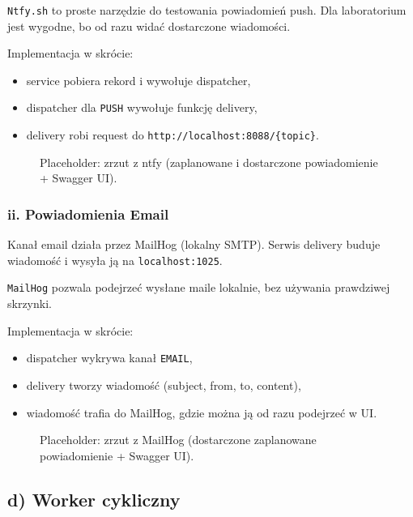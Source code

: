 \documentclass[a4paper,12pt]{article}
\begin{document}
\texttt{Ntfy.sh} to proste narzędzie do testowania powiadomień push. Dla laboratorium jest wygodne, bo od razu widać dostarczone wiadomości.

Implementacja w skrócie:
\begin{itemize}[leftmargin=1.5em]
    \item service pobiera rekord i wywołuje dispatcher,
    \item dispatcher dla \texttt{PUSH} wywołuje funkcję delivery,
    \item delivery robi request do \texttt{http://localhost:8088/\{topic\}}.
\end{itemize}

\begin{figure}[H]
    \centering
    \caption{Placeholder: zrzut z ntfy (zaplanowane i dostarczone powiadomienie + Swagger UI).}
\end{figure}

\subsubsection*{ii. Powiadomienia Email}

Kanał email działa przez MailHog (lokalny SMTP). Serwis delivery buduje wiadomość i wysyła ją na \texttt{localhost:1025}.

\texttt{MailHog} pozwala podejrzeć wysłane maile lokalnie, bez używania prawdziwej skrzynki.

Implementacja w skrócie:
\begin{itemize}[leftmargin=1.5em]
    \item dispatcher wykrywa kanał \texttt{EMAIL},
    \item delivery tworzy wiadomość (subject, from, to, content),
    \item wiadomość trafia do MailHog, gdzie można ją od razu podejrzeć w UI.
\end{itemize}

\begin{figure}[H]
    \centering
    \caption{Placeholder: zrzut z MailHog (dostarczone zaplanowane powiadomienie + Swagger UI).}
\end{figure}

\subsection*{d) Worker cykliczny}
\end{document}
